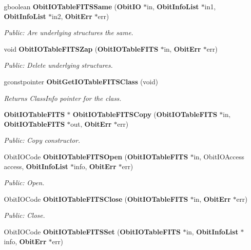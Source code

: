 \begin{CompactItemize}
gboolean {\bf Obit\-IOTable\-FITSSame} ({\bf Obit\-IO} $\ast$in, {\bf Obit\-Info\-List} $\ast$in1, {\bf Obit\-Info\-List} $\ast$in2, {\bf Obit\-Err} $\ast$err)
\begin{CompactList}\small\item\em Public: Are underlying structures the same. \item\end{CompactList}\item 
void {\bf Obit\-IOTable\-FITSZap} ({\bf Obit\-IOTable\-FITS} $\ast$in, {\bf Obit\-Err} $\ast$err)
\begin{CompactList}\small\item\em Public: Delete underlying structures. \item\end{CompactList}\item 
gconstpointer {\bf Obit\-Get\-IOTable\-FITSClass} (void)
\begin{CompactList}\small\item\em Returns Class\-Info pointer for the class. \item\end{CompactList}\item 
{\bf Obit\-IOTable\-FITS} $\ast$ {\bf Obit\-IOTable\-FITSCopy} ({\bf Obit\-IOTable\-FITS} $\ast$in, {\bf Obit\-IOTable\-FITS} $\ast$out, {\bf Obit\-Err} $\ast$err)
\begin{CompactList}\small\item\em Public: Copy constructor. \item\end{CompactList}\item 
Obit\-IOCode {\bf Obit\-IOTable\-FITSOpen} ({\bf Obit\-IOTable\-FITS} $\ast$in, Obit\-IOAccess access, {\bf Obit\-Info\-List} $\ast$info, {\bf Obit\-Err} $\ast$err)
\begin{CompactList}\small\item\em Public: Open. \item\end{CompactList}\item 
Obit\-IOCode {\bf Obit\-IOTable\-FITSClose} ({\bf Obit\-IOTable\-FITS} $\ast$in, {\bf Obit\-Err} $\ast$err)
\begin{CompactList}\small\item\em Public: Close. \item\end{CompactList}\item 
Obit\-IOCode {\bf Obit\-IOTable\-FITSSet} ({\bf Obit\-IOTable\-FITS} $\ast$in, {\bf Obit\-Info\-List} $\ast$info, {\bf Obit\-Err} $\ast$err)

\end{CompactItemize}
